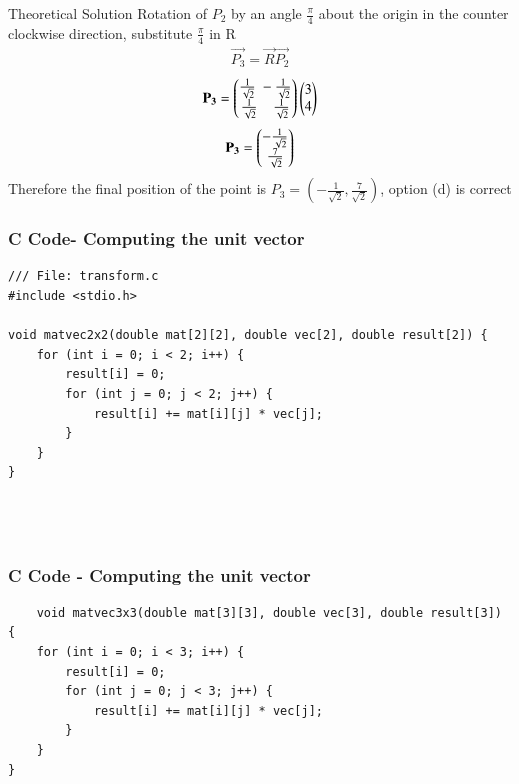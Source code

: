 \documentclass{beamer}
\begin{document}
    \begin{frame}{Theoretical Solution}
             Rotation of $P_2$ by an angle $\frac{\pi}{4}$ about the origin in the counter clockwise direction, substitute $\frac{\pi}{4}$ in R
             \begin{align}
                 \vec{P_3}=\vec{R}\vec{P_2}
             \end{align}
             \begin{align}
                 \mathbf{P_3}=\begin{pmatrix}\frac{1}{\sqrt{2}}\;-\frac{1}{\sqrt{2}}\\\frac{1}{\sqrt{2}}\;\;\;\;\frac{1}{\sqrt{2}}\end{pmatrix}\begin{pmatrix}3\\4\end{pmatrix}
             \end{align}
             \begin{align}
                 \mathbf{P_3}=\begin{pmatrix}-\frac{1}{\sqrt{2}}\\\frac{7}{\sqrt{2}}\end{pmatrix}
             \end{align}
             Therefore the final position of the point is $P_3=(-\frac{1}{\sqrt{2}},\frac{7}{\sqrt{2}})$, option (d) is correct
    \end{frame}
	\begin{frame}[fragile]
	\frametitle{C Code- Computing the unit vector}
	
	\begin{lstlisting}
/// File: transform.c
#include <stdio.h>

void matvec2x2(double mat[2][2], double vec[2], double result[2]) {
    for (int i = 0; i < 2; i++) {
        result[i] = 0;
        for (int j = 0; j < 2; j++) {
            result[i] += mat[i][j] * vec[j];
        }
    }
}




	\end{lstlisting}
\end{frame}
\begin{frame}[fragile]
\frametitle{C Code - Computing the unit vector}
\begin{lstlisting}
    void matvec3x3(double mat[3][3], double vec[3], double result[3]) {
    for (int i = 0; i < 3; i++) {
        result[i] = 0;
        for (int j = 0; j < 3; j++) {
            result[i] += mat[i][j] * vec[j];
        }
    }
}
\end{lstlisting}
\end{frame}
\end{document}
